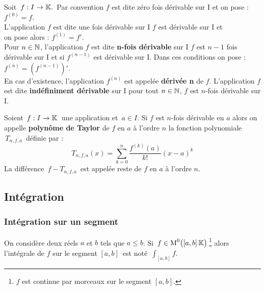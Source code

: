 Soit \(\, f:I\to \mathbb{K}.\,\) Par convention $f$ est dite zéro fois dérivable sur I et on pose : $f^{(0)}=f$.\vspace{0.1cm}\\
L'application $f$ est dite une fois dérivable sur I \ssi $f$ est dérivable sur I et\\
on pose alors : $f^{(1)}=f'$.\vspace{0.1cm}\\
Pour \(n\in \mathbb{N}\)\expo{*}, l'application $f$ est dite \textbf{n-fois dérivable} sur I \ssi $f$ est $n-1$ fois dérivable sur I et si $f^{(n-1)}$ est dérivable sur I. Dans ces conditions on pose : \(f^{(n)}=\left(f^{(n-1)}\right)'.\)\vspace{0.1cm}\\
En cas d'existence, l'application $f^{(n)}$ est appelée \textbf{dérivée n} de $f$. L'application $f$ est dite \textbf{indéfiniment dérivable} sur I \ssi pour tout \(n\in \mathbb{N}\), $f$ est $n$-fois dérivable sur I. 

\vspace{1.3cm}

Soient \(\,f:I\to \mathbb{K}\,\) une application et \(\,a\in I\). Si $f$ est $n$-fois dérivable en $a$ alors on appelle \textbf{polynôme de Taylor} de $f$ en $a$ à l'ordre $n$ la fonction polynomiale $\,T_{n,f,a}\,$ définie par : \vspace{-0.1cm}
\[T_{n,f,a}(x)=\sum_{k=0}^n\frac{f^{(k)}(a)}{k!}(x-a)^k\]
La différence \(\,f-T_{n,f,a}\,\) est appelée reste de $f$ en $a$ à l'ordre $n$.

\newpage

\subsection{Intégration}

\vspace{1cm}

\subsubsection{Intégration sur un segment}

\vspace{1cm}

On considère deux réels $a$ et $b$ tels que $a\leq b$. Si \(\,f\in \text{M}^0\bigl([a,b]\,\mathbb{K}\bigr)\,\)\footnote{$f$ est continue par morceaux sur le segment $[a,b]$.} alors l'intégrale de $f$ sur le segment \([a,b]\,\) est noté \(\,\displaystyle\int_{[a,b]}\!f\).

